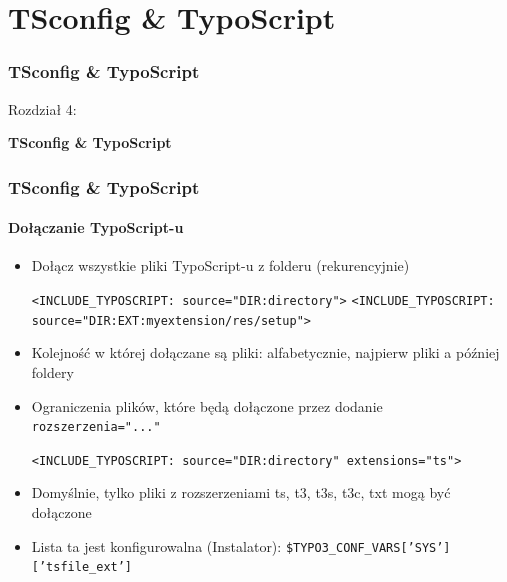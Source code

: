 %
\section{TSconfig \& TypoScript}
\begin{frame}[fragile]
	\frametitle{TSconfig \& TypoScript}

	\begin{center}\huge{Rozdział 4:}\end{center}
	\begin{center}\huge{\color{typo3darkgrey}\textbf{TSconfig \& TypoScript}}\end{center}

\end{frame}


\begin{frame}[fragile]
	\frametitle{TSconfig \& TypoScript}
	\framesubtitle{Dołączanie TypoScript-u}

	\begin{itemize}
		\item Dołącz wszystkie pliki TypoScript-u z folderu (rekurencyjnie)

			\lstinline!<INCLUDE_TYPOSCRIPT: source="DIR:directory">!
			\lstinline!<INCLUDE_TYPOSCRIPT: source="DIR:EXT:myextension/res/setup">!

		\item Kolejność w której dołączane są pliki:\newline
			alfabetycznie, najpierw pliki a później foldery
		\item Ograniczenia plików, które będą dołączone przez dodanie \texttt{rozszerzenia="..."}

			\lstinline!<INCLUDE_TYPOSCRIPT: source="DIR:directory" extensions="ts">!

		\item Domyślnie, tylko pliki z rozszerzeniami ts, t3, t3s, t3c, txt mogą być dołączone
		\item Lista ta jest konfigurowalna (Instalator):\newline
			\texttt{\$TYPO3\_CONF\_VARS['SYS']['tsfile\_ext']}
	\end{itemize}

\end{frame}

